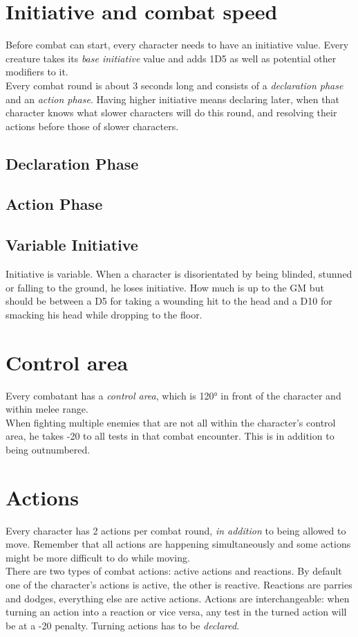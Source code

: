 \section{Initiative and combat speed}
Before combat can start, every character needs to have an initiative value. Every creature takes its \emph{base initiative} value and adds 1D5 as well as potential other modifiers to it.\\
Every combat round is about 3 seconds long and consists of a \textit{declaration phase} and an \textit{action phase}. Having higher initiative means declaring later, when that character knows what slower characters will do this round, and resolving their actions before those of slower characters.
\subsection{Declaration Phase}
\subsection{Action Phase}
\subsection{Variable Initiative}
Initiative is variable. When a character is disorientated by being blinded, stunned or falling to the ground, he loses initiative. How much is up to the GM but should be between a D5 for taking a wounding hit to the head and a D10 for smacking his head while dropping to the floor.
\section{Control area}
Every combatant has a \emph{control area}, which is 120° in front of the character and within melee range. \\
When fighting multiple enemies that are not all within the character's control area, he takes -20 to all tests in that combat encounter. This is in addition to being outnumbered.
\section{Actions}
Every character has 2 actions per combat round, \emph{in addition} to being allowed to move. Remember that all actions are happening simultaneously and some actions might be more difficult to do while moving.\\
There are two types of combat actions: active actions and reactions. By default one of the character’s actions is active, the other is reactive. Reactions are parries and dodges, everything else are active actions. Actions are interchangeable: when turning an action into a reaction or vice versa, any test in the turned action will be at a -20 penalty. Turning actions has to be \emph{declared}.
